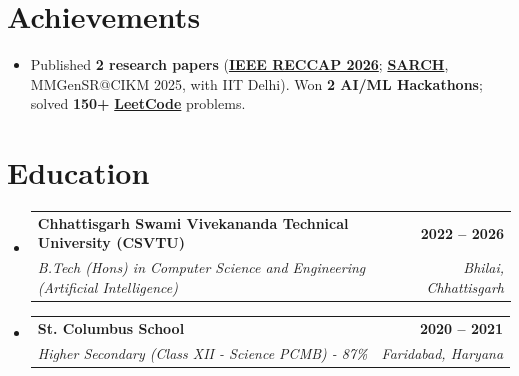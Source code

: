 \documentclass[letterpaper,10pt]{article}
\makeatletter
\newcommand{\resumeItem}[1]{\item\small{{#1 \vspace{-2pt}}}}
\newcommand{\resumeSubheading}[4]{
  \vspace{-1pt}\item
    \begin{tabular*}{0.97\textwidth}[t]{l@{\extracolsep{\fill}}r}
      \textbf{#1} & \color{greenTheme}\textbf{#2} \\
      \textit{\small#3} & \textit{\small\color{lightGray} #4} \\
    \end{tabular*}\vspace{-6pt}
}
\newcommand{\resumeSubHeadingListStart}{\begin{itemize}[leftmargin=0.15in, label={}]}
\newcommand{\resumeSubHeadingListEnd}{\end{itemize}}
\newcommand{\resumeItemListStart}{\begin{itemize}}
\newcommand{\resumeItemListEnd}{\end{itemize}\vspace{-5pt}}
\makeatother
\begin{document}
\section{Achievements}
\resumeItemListStart
\resumeItem{Published \textbf{2 research papers} (\href{https://ieeexplore.ieee.org/document/11723852}{\textbf{IEEE RECCAP 2026}}; \href{https://arxiv.org/abs/2511.05667}{\textbf{SARCH}}, MMGenSR@CIKM 2025, with IIT Delhi). Won \textbf{2 AI/ML Hackathons}; solved \textbf{150+} \href{https://leetcode.com/u/ashutoshroy02/}{\textbf{LeetCode}} problems.}
\resumeItemListEnd

\section{Education}
\resumeSubHeadingListStart
\resumeSubheading{Chhattisgarh Swami Vivekananda Technical University (CSVTU)}{2022 -- 2026}{B.Tech (Hons) in Computer Science and Engineering (Artificial Intelligence)}{Bhilai, Chhattisgarh}
\resumeSubheading{St. Columbus School}{2020 -- 2021}{Higher Secondary (Class XII - Science PCMB) - 87\%}{Faridabad, Haryana}
\resumeSubHeadingListEnd
\end{document}
